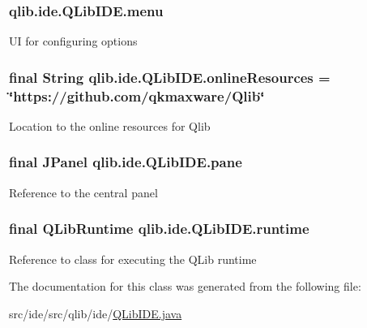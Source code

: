 \subsubsection[{\texorpdfstring{menu}{menu}}]{ qlib.\+ide.\+Q\+Lib\+I\+D\+E.\+menu\hspace{0.3cm}{\ttfamily [private]}}\hypertarget{classqlib_1_1ide_1_1QLibIDE_ae822573114cbc618b4af0ddf3726b06b}{}\label{classqlib_1_1ide_1_1QLibIDE_ae822573114cbc618b4af0ddf3726b06b}
UI for configuring options 
\subsubsection[{\texorpdfstring{online\+Resources}{onlineResources}}]{\setlength{\rightskip}{0pt plus 5cm}final String qlib.\+ide.\+Q\+Lib\+I\+D\+E.\+online\+Resources = \char`\"{}https\+://github.\+com/qkmaxware/Qlib\char`\"{}\hspace{0.3cm}{\ttfamily [static]}}\hypertarget{classqlib_1_1ide_1_1QLibIDE_aeaa0895eee29e9d5cf4e657134d56803}{}\label{classqlib_1_1ide_1_1QLibIDE_aeaa0895eee29e9d5cf4e657134d56803}
Location to the online resources for Qlib 
\subsubsection[{\texorpdfstring{pane}{pane}}]{\setlength{\rightskip}{0pt plus 5cm}final J\+Panel qlib.\+ide.\+Q\+Lib\+I\+D\+E.\+pane\hspace{0.3cm}{\ttfamily [private]}}\hypertarget{classqlib_1_1ide_1_1QLibIDE_a599d44725656f74ca6d6fc028b8973a8}{}\label{classqlib_1_1ide_1_1QLibIDE_a599d44725656f74ca6d6fc028b8973a8}
Reference to the central panel 
\subsubsection[{\texorpdfstring{runtime}{runtime}}]{\setlength{\rightskip}{0pt plus 5cm}final {\bf Q\+Lib\+Runtime} qlib.\+ide.\+Q\+Lib\+I\+D\+E.\+runtime\hspace{0.3cm}{\ttfamily [private]}}\hypertarget{classqlib_1_1ide_1_1QLibIDE_a07b6d9558a76bd5d818a98debdb93d5f}{}\label{classqlib_1_1ide_1_1QLibIDE_a07b6d9558a76bd5d818a98debdb93d5f}
Reference to class for executing the Q\+Lib runtime 

The documentation for this class was generated from the following file\+:\begin{DoxyCompactItemize}
\item 
src/ide/src/qlib/ide/\hyperlink{QLibIDE_8java}{Q\+Lib\+I\+D\+E.\+java}\end{DoxyCompactItemize}
